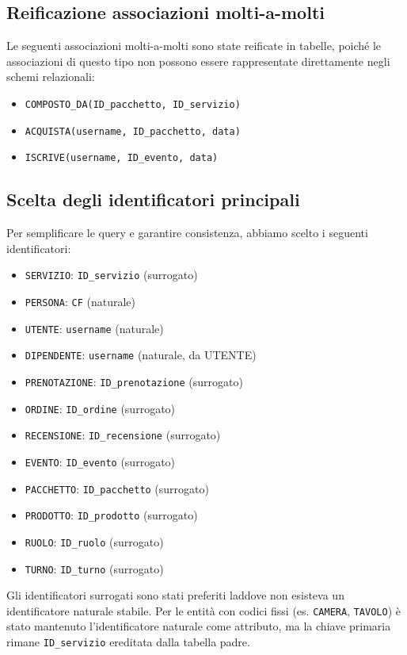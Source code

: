 \documentclass[a4paper,12pt]{report}
\begin{document}
\subsection{Reificazione associazioni molti-a-molti}

Le seguenti associazioni molti-a-molti sono state reificate in tabelle, poiché le associazioni di
questo tipo non possono essere rappresentate direttamente negli schemi relazionali:

\begin{itemize}
	\item \texttt{COMPOSTO\_DA(ID\_pacchetto, ID\_servizio)}
	\item \texttt{ACQUISTA(username, ID\_pacchetto, data)}
	\item \texttt{ISCRIVE(username, ID\_evento, data)}
\end{itemize}

\subsection{Scelta degli identificatori principali}
Per semplificare le query e garantire consistenza, abbiamo scelto i seguenti identificatori:

\begin{itemize}
	\item \texttt{SERVIZIO}: \texttt{ID\_servizio} (surrogato)
	\item \texttt{PERSONA}: \texttt{CF} (naturale)
	\item \texttt{UTENTE}: \texttt{username} (naturale)
	\item \texttt{DIPENDENTE}: \texttt{username} (naturale, da UTENTE)
	\item \texttt{PRENOTAZIONE}: \texttt{ID\_prenotazione} (surrogato)
	\item \texttt{ORDINE}: \texttt{ID\_ordine} (surrogato)
	\item \texttt{RECENSIONE}: \texttt{ID\_recensione} (surrogato)
	\item \texttt{EVENTO}: \texttt{ID\_evento} (surrogato)
	\item \texttt{PACCHETTO}: \texttt{ID\_pacchetto} (surrogato)
	\item \texttt{PRODOTTO}: \texttt{ID\_prodotto} (surrogato)
	\item \texttt{RUOLO}: \texttt{ID\_ruolo} (surrogato)
	\item \texttt{TURNO}: \texttt{ID\_turno} (surrogato)
\end{itemize}

Gli identificatori surrogati sono stati preferiti laddove non esisteva un identificatore
naturale stabile. Per le entità con codici fissi (es. \texttt{CAMERA}, \texttt{TAVOLO}) è stato
mantenuto l'identificatore naturale come attributo, ma la chiave primaria rimane \texttt{ID\_servizio}
ereditata dalla tabella padre.
\end{document}
